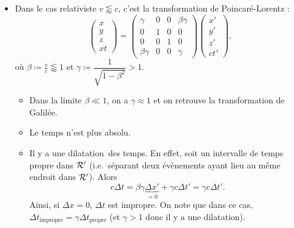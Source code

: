 \begin{itemize}
                \item Dans le cas relativiste $v\lessapprox c$, c'est la transformation de Poincaré-Lorentz :
                \begin{equation*}
                    \begin{pmatrix}
                        x\\y\\z\\xt
                    \end{pmatrix}=\begin{pmatrix}
                        \gamma&0&0&\beta\gamma\\
                        0&1&0&0\\
                        0&0&1&0\\
                        \beta\gamma&0&0&\gamma
                    \end{pmatrix}\begin{pmatrix}
                        x'\\y'\\z'\\ct'
                    \end{pmatrix},
                \end{equation*}
                où $\beta\coloneqq\frac{v}{c}\lessapprox1$ et $\gamma\coloneqq\dfrac{1}{\sqrt{1-\beta^{2}}}>1$.
                \begin{itemize}[label=$\longrightarrow$]
                    \item Dans la limite $\beta\ll1$, on a $\gamma\approx1$ et on retrouve la transformation de Galilée.
                    \item Le temps n'est plus absolu.
                    \item Il y a une \og dilatation\fg~des temps. En effet, soit un intervalle de temps propre dans $\mathcal{R}'$ (i.e.~séparant deux évènements ayant lieu au même endroit dans $\mathcal{R}'$). Alors 
                    \begin{equation*}
                        c\Delta t=\beta\gamma\underbrace{\Delta x'}_{=0}+\gamma c\Delta t'=\gamma c\Delta t'.
                    \end{equation*}
                    Ainsi, si $\Delta x=0$, $\Delta t$ est \og impropre\fg. On note que dans ce cas, $\Delta t_{\text{impropre}}=\gamma\Delta t_{\text{propre}}$ (et $\gamma>1$ donc il y a une \og dilatation\fg).
                \end{itemize}
            \end{itemize}

